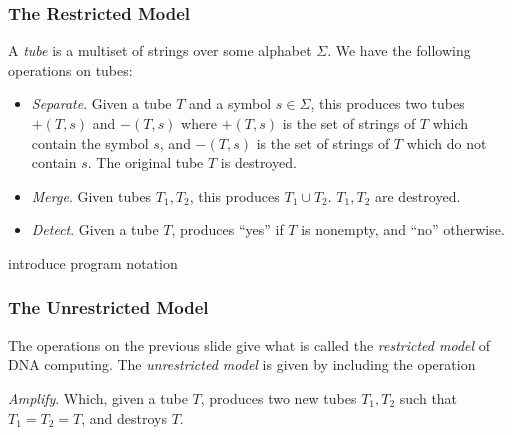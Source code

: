 \documentclass{beamer}
\begin{document}
\begin{frame}

\end{frame}




\begin{frame}
\frametitle{The Restricted Model}
A \emph{tube} is a multiset of strings over some alphabet $\Sigma$. We have the following operations on tubes:
\begin{itemize}
\item \emph{Separate}. Given a tube $T$ and a symbol $s \in \Sigma$, this produces two tubes $+(T,s)$ and $-(T,s)$ where $+(T,s)$ is the set of strings of $T$ which contain the symbol $s$, and $-(T,s)$ is the set of strings of $T$ which do not contain $s$. The original tube $T$ is destroyed.
\item \emph{Merge}. Given tubes $T_1,T_2$, this produces $T_1 \cup T_2$. $T_1, T_2$ are destroyed.
\item \emph{Detect}. Given a tube $T$, produces ``yes'' if $T$ is nonempty, and ``no'' otherwise.
\end{itemize}
\end{frame}

\begin{frame}

introduce program notation
\end{frame}

\begin{frame}
\frametitle{The Unrestricted Model}

The operations on the previous slide give what is called the \emph{restricted model} of DNA computing. The \emph{unrestricted model} is given by including the operation

\emph{Amplify}. Which, given a tube $T$, produces two new tubes $T_1, T_2$ such that $T_1 = T_2 = T$, and destroys $T$.
\end{frame}
\end{document}
